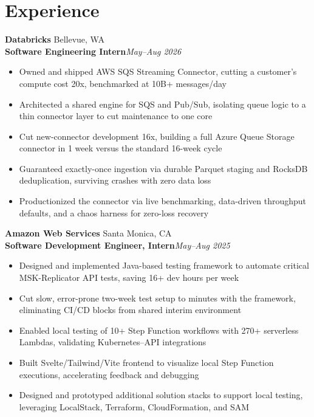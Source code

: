 \documentclass[letterpaper,10pt]{article}
\newcommand{\company}[2]{
    \vspace{3pt}
    {\large \textbf{#1}}
    \hfill
    {\normalsize {#2}}
    \\
}
\newcommand{\position}[2]{%
    \vspace{2pt}%
    \normalsize \leftRight{\textbf{#1}}{\textit{#2}}%
    \par%
}
\newcommand{\leftRight}[2]{%
  \leavevmode#1\hfill#2\par%
}
\newcommand{\itemsBegin}{
    \begin{itemize}[leftmargin=0.2in, labelsep=0.05in, itemsep=0pt, parsep=1pt, topsep=0pt, partopsep=0pt]
    \small
}
\newcommand{\itemsEnd}{\end{itemize}}
\begin{document}
\section{Experience}

    \company{Databricks}{Bellevue, WA}
    \position{Software Engineering Intern}{May--Aug 2026}
    \itemsBegin{}
        \item Owned and shipped AWS SQS Streaming Connector, cutting a customer's compute cost 20x, benchmarked at 10B+ messages/day
        \item Architected a shared engine for SQS and Pub/Sub, isolating queue logic to a thin connector layer to cut maintenance to one core
        \item Cut new-connector development 16x, building a full Azure Queue Storage connector in 1 week versus the standard 16-week cycle
        \item Guaranteed exactly-once ingestion via durable Parquet staging and RocksDB deduplication, surviving crashes with zero data loss
        \item Productionized the connector via live benchmarking, data-driven throughput defaults, and a chaos harness for zero-loss recovery
    \itemsEnd{}

    \company{Amazon Web Services}{Santa Monica, CA}
    \position{Software Development Engineer, Intern}{May--Aug 2025}
    \itemsBegin{}
        \item Designed and implemented Java-based testing framework to automate critical MSK-Replicator API tests, saving 16+ dev hours per week
        \item Cut slow, error-prone two-week test setup to minutes with the framework, eliminating CI/CD blocks from shared interim environment
        \item Enabled local testing of 10+ Step Function workflows with 270+ serverless Lambdas, validating Kubernetes--API integrations
        \item Built Svelte/Tailwind/Vite frontend to visualize local Step Function executions, accelerating feedback and debugging
        \item Designed and prototyped additional solution stacks to support local testing, leveraging LocalStack, Terraform, CloudFormation, and SAM
    \itemsEnd{}
\end{document}
